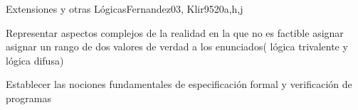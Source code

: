\begin{syllabus}
\begin{unit}{Extensiones y otras Lógicas}{}{Fernandez03, Klir95}{20}{a,h,j}
   \begin{learningoutcomes}
      \item Representar aspectos complejos de la realidad en la que no es factible asignar asignar un rango de dos valores de verdad a los enunciados( lógica trivalente y lógica difusa)
      \item Establecer las nociones fundamentales de especificación formal y verificación de programas
   \end{learningoutcomes}
\end{unit}

\begin{coursebibliography}
\end{coursebibliography}

\end{syllabus}

%
